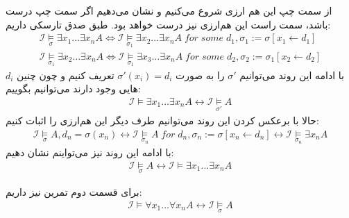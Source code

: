 \documentclass[]{exam}
\begin{document}
از سمت چپ این هم ارزی شروع می‌کنیم و نشان می‌دهیم اگر سمت چپ درست باشد، سمت راست این هم‌ارزی نیز درست خواهد بود.
طبق صدق تارسکی داریم:
\begin{align}
    \mathscr{I} \underset{\sigma}{\models} \exists x_1 \dots \exists x_n A \Longleftrightarrow
    \mathscr{I} \underset{\sigma_1}{\models} \exists x_2 \dots \exists x_n A \; for \; some \; d_1, \sigma_1 := \sigma[x_1 \leftarrow d_1] \\
    \mathscr{I} \underset{\sigma_1}{\models} \exists x_2 \dots \exists x_n A \Longleftrightarrow
    \mathscr{I} \underset{\sigma_1}{\models} \exists x_3 \dots \exists x_n A \; for \; some \; d_2, \sigma_2 := \sigma_1[x_2 \leftarrow d_2]
\end{align}
با ادامه این روند می‌توانیم $\sigma'$ را به صورت $\sigma'(x_i) = d_i$ تعریف کنیم
و چون چنین $d_i$ هایی وجود دارند می‌توانیم بگوییم:
\begin{align}
    \mathscr{I} \models \exists x_1 \dots \exists x_n A \longleftrightarrow \mathscr{I} \underset{\sigma'}{\models} A
\end{align}
حالا با برعکس کردن این روند می‌توانیم طرف دیگر این هم‌ارزی را اثبات کنیم:
\begin{align}
    \mathscr{I} \underset{\sigma}{\models} A, d_n = \sigma(x_n) \longleftrightarrow
    \mathscr{I} \underset{\sigma_n}{\models} A \; for \; d_n, \sigma_n := \sigma[x_n \leftarrow d_n] \longleftrightarrow
    \mathscr{I} \underset{\sigma_n}{\models} \exists x_n A
\end{align}
با ادامه این روند نیز می‌تواینم نشان دهیم:
\begin{align}
    \mathscr{I} \underset{\sigma}{\models} A \longleftrightarrow \mathscr{I} \models \exists x_1 \dots \exists x_n A
\end{align}

برای قسمت دوم تمرین نیز داریم:
\begin{align}
    \mathscr{I} \models \forall x_1 \dots \forall x_n A \longleftrightarrow \mathscr{I} \underset{\sigma}{\models} A
\end{align}
\end{document}
